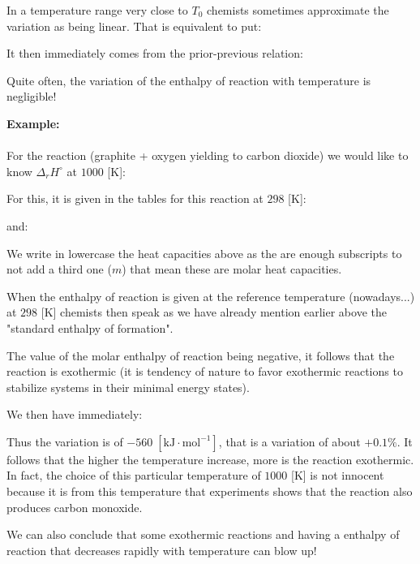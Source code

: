 	In a temperature range very close to $T_0$ chemists sometimes approximate the variation as being linear. That is equivalent to put:
	
	It then immediately comes from the prior-previous relation:
	
	\begin{tcolorbox}[title=Remark,colframe=black,arc=10pt]
	Quite often, the variation of the enthalpy of reaction with temperature is negligible!
	\end{tcolorbox}
	\begin{tcolorbox}[colframe=black,colback=white,sharp corners]
	\textbf{{\Large {}}Example:}\\\\
	For the reaction (graphite + oxygen yielding to carbon dioxide) we would like to know $\Delta_r H^\circ$ at $1000$ [K]:
	
	For this, it is given in the tables for this reaction at $298$ [K]:
	
	and:
	
	We write in lowercase the heat capacities above as the are enough subscripts to not add a third one ($m$) that mean these are molar heat capacities.
	\begin{tcolorbox}[title=Remark,colframe=black,arc=10pt]
	When the enthalpy of reaction is given at the reference temperature (nowadays...) at $298$ [K] chemists then speak as we have already mention earlier above the "standard enthalpy of formation".
	\end{tcolorbox}
	The value of the molar enthalpy of reaction being negative, it follows that the reaction is exothermic (it is tendency of nature to favor exothermic reactions to stabilize systems in their minimal energy states).
	\end{tcolorbox}
	
	\begin{tcolorbox}[colframe=black,colback=white,sharp corners]
	We then have immediately:
	
	Thus the variation is of $-560\;[\text{kJ}\cdot \text{mol}^{-1}]$, that is a variation of about $+0.1\%$. It follows that the higher the temperature increase, more is the reaction exothermic. In fact, the choice of this particular temperature of $1000$ [K] is not innocent because it is from this temperature that experiments shows that the reaction also produces carbon monoxide.
	\end{tcolorbox}
	We can also conclude that some exothermic reactions and having a enthalpy of reaction that decreases rapidly with temperature can blow up!
	
